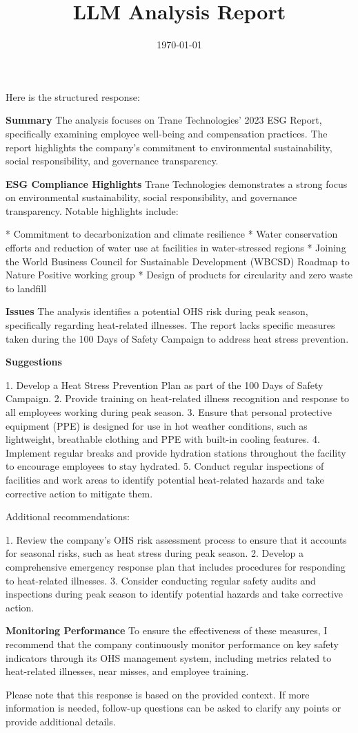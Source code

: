 \documentclass{article}
\title{LLM Analysis Report}
\date{\today}
\begin{document}
                \maketitle

                Here is the structured response:

\textbf{Summary}
The analysis focuses on Trane Technologies' 2023 ESG Report, specifically examining employee well-being and compensation practices. The report highlights the company's commitment to environmental sustainability, social responsibility, and governance transparency.

\textbf{ESG Compliance Highlights}
Trane Technologies demonstrates a strong focus on environmental sustainability, social responsibility, and governance transparency. Notable highlights include:

* Commitment to decarbonization and climate resilience
* Water conservation efforts and reduction of water use at facilities in water-stressed regions
* Joining the World Business Council for Sustainable Development (WBCSD) Roadmap to Nature Positive working group
* Design of products for circularity and zero waste to landfill

\textbf{Issues}
The analysis identifies a potential OHS risk during peak season, specifically regarding heat-related illnesses. The report lacks specific measures taken during the 100 Days of Safety Campaign to address heat stress prevention.

\textbf{Suggestions}

1. Develop a Heat Stress Prevention Plan as part of the 100 Days of Safety Campaign.
2. Provide training on heat-related illness recognition and response to all employees working during peak season.
3. Ensure that personal protective equipment (PPE) is designed for use in hot weather conditions, such as lightweight, breathable clothing and PPE with built-in cooling features.
4. Implement regular breaks and provide hydration stations throughout the facility to encourage employees to stay hydrated.
5. Conduct regular inspections of facilities and work areas to identify potential heat-related hazards and take corrective action to mitigate them.

Additional recommendations:

1. Review the company's OHS risk assessment process to ensure that it accounts for seasonal risks, such as heat stress during peak season.
2. Develop a comprehensive emergency response plan that includes procedures for responding to heat-related illnesses.
3. Consider conducting regular safety audits and inspections during peak season to identify potential hazards and take corrective action.

\textbf{Monitoring Performance}
To ensure the effectiveness of these measures, I recommend that the company continuously monitor performance on key safety indicators through its OHS management system, including metrics related to heat-related illnesses, near misses, and employee training.

Please note that this response is based on the provided context. If more information is needed, follow-up questions can be asked to clarify any points or provide additional details.

                
\end{document}
